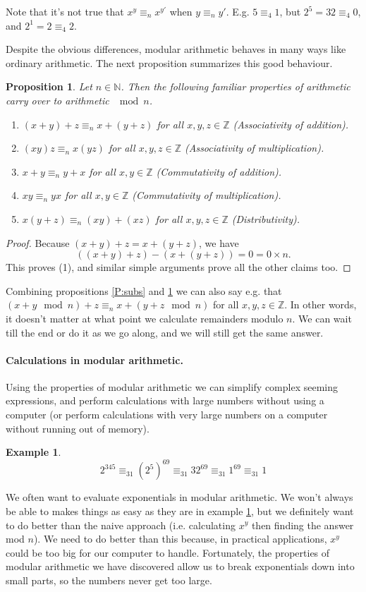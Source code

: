 \documentclass{article}
\theoremstyle{plain}
\newtheorem{proposition}[theorem]{Proposition}{\bfseries}{\itshape}
\newtheorem{example}[theorem]{Example}{\bfseries}{\upshape}
\newcommand{\bN}{\mathbb{N}}
\newcommand{\bZ}{\mathbb{Z}}
\begin{document}
Note that it's not true that $x^y \equiv_n x^{y'}$ when $y\equiv_n y'$. E.g. $5\equiv_4 1$, but $2^5 = 32 \equiv_4 0$, and $2^1 = 2 \equiv_4 2$.

Despite the obvious differences, modular arithmetic behaves in many ways like ordinary arithmetic. The next proposition summarizes this good behaviour. 
\begin{proposition}\label{P:arith}
Let $n\in \bN$. Then the following familiar properties of arithmetic carry over to arithmetic $\mod n$.
\begin{enumerate}[(1)]
\item $(x + y) + z \equiv_n x + (y + z)$ for all $x,y,z\in\bZ$ (Associativity of addition).
\item $(xy)z \equiv_n x(yz)$ for all $x,y,z\in\bZ$ (Associativity of multiplication).
\item $x + y \equiv_n y + x$ for all $x,y\in\bZ$ (Commutativity of addition).
\item $xy \equiv_n yx$ for all $x,y\in\bZ$ (Commutativity of multiplication).
\item $x(y + z) \equiv_n (xy) + (xz)$ for all $x,y,z\in\bZ$ (Distributivity).
\end{enumerate}
\end{proposition}
\begin{proof}\mbox{}
Because $(x+y)+z = x+(y+z)$, we have 
\[((x+y)+z) - (x+(y+z))=0=0\times n.\]
This proves (1), and similar simple arguments prove all the other claims too. 
\end{proof}

Combining propositions \ref{P:subs} and \ref{P:arith} we can also say e.g. that $(x + y \mod n) + z \equiv_n x + (y + z \mod n)$ for all $x,y,z\in\bZ$. In other words, it doesn't matter at what point we calculate remainders modulo $n$. We can wait till the end or do it as we go along, and we will still get the same answer.

\paragraph{Calculations in modular arithmetic.} Using the properties of modular arithmetic we can simplify complex seeming expressions, and perform calculations with large numbers without using a computer (or perform calculations with very large numbers on a computer without running out of memory).

\begin{example}\label{E:simp}
\[2^{345} \equiv_{31} (2^5)^{69} \equiv_{31} 32^{69} \equiv_{31} 1^{69} \equiv_{31} 1 \]
\end{example} 
We often want to evaluate exponentials in modular arithmetic. We won't always be able to makes things as easy as they are in example \ref{E:simp}, but we definitely want to do better than the naive approach (i.e. calculating $x^y$ then finding the answer mod $n$). We need to do better than this because, in practical applications, $x^y$ could be too big for our computer to handle. Fortunately, the properties of modular arithmetic we have discovered allow us to break exponentials down into small parts, so the numbers never get too large.
\end{document}
